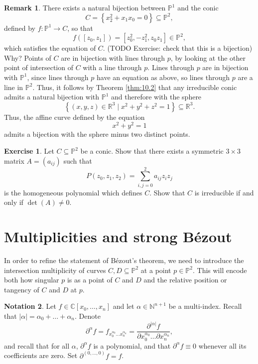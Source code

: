 \documentclass{article}
\newcommand{\N}{\mathbb{N}}
\newcommand{\R}{\mathbb{R}}
\newcommand{\C}{\mathbb{C}}
\renewcommand{\P}{\mathbb{P}}
\newcommand{\rb}[1]{\left( #1 \right)}
\renewcommand{\sb}[1]{\left[ #1 \right]}
\newcommand{\cb}[1]{\left\{ #1 \right\}}
\newcommand{\abs}[1]{\left\lvert #1 \right\rvert}
\theoremstyle{definition}\newtheorem{definition}{Definition}[section]
\theoremstyle{definition}\newtheorem{notation}[definition]{Notation}
\theoremstyle{definition}\newtheorem{remark}[definition]{Remark}
\theoremstyle{definition}\newtheorem{example}[definition]{Example}
\theoremstyle{definition}\newtheorem{fact}{Fact}
\theoremstyle{definition}\newtheorem{exercise}{Exercise}
\begin{document}
\begin{remark}
There exists a natural bijection between $ \P^1 $ and the conic
$$ C = \cb{x_2^2 + x_1x_0 = 0} \subseteq \P^2, $$
defined by $ f : \P^1 \to C $, so that
$$ f\rb{\sb{z_0, z_1}} = \sb{z_0^2, -z_1^2, z_0z_1} \in \P^2, $$
which satisfies the equation of $ C $. (TODO Exercise: check that this is a bijection) Why? Points of $ C $ are in bijection with lines through $ p $, by looking at the other point of intersection of $ C $ with a line through $ p $. Lines through $ p $ are in bijection with $ \P^1 $, since lines through $ p $ have an equation as above, so lines through $ p $ are a line in $ \P^2 $. Thus, it follows by Theorem \ref{thm:10.2} that any irreducible conic admits a natural bijection with $ \P^1 $ and therefore with the sphere
$$ \cb{\rb{x, y, z} \in \R^3 \mid x^2 + y^2 + z^2 = 1} \subseteq \R^3. $$
Thus, the affine curve defined by the equation
$$ x^2 + y^2 = 1 $$
admits a bijection with the sphere minus two distinct points.
\end{remark}

\begin{exercise}
\label{ex:31}
Let $ C \subseteq \P^2 $ be a conic. Show that there exists a symmetric $ 3 \times 3 $ matrix $ A = \rb{a_{ij}} $ such that
$$ P\rb{z_0, z_1, z_2} = \sum_{i, j = 0}^2 a_{ij}z_iz_j $$
is the homogeneous polynomial which defines $ C $. Show that $ C $ is irreducible if and only if $ \det\rb{A} \ne 0 $.
\end{exercise}

\section{Multiplicities and strong Bézout}

In order to refine the statement of Bézout's theorem, we need to introduce the intersection multiplicity of curves $ C, D \subseteq \P^2 $ at a point $ p \in \P^2 $. This will encode both how singular $ p $ is as a point of $ C $ and $ D $ and the relative position or tangency of $ C $ and $ D $ at $ p $.

\begin{notation}
Let $ f \in \C\sb{x_0, \dots, x_n} $ and let $ \alpha \in \N^{n + 1} $ be a multi-index. Recall that $ \abs{\alpha} = \alpha_0 + \dots + \alpha_n $. Denote
$$ \partial^\alpha f = f_{x_0^{\alpha_0} \dots x_n^{\alpha_n}} = \dfrac{\partial^{\abs{\alpha}} f}{\partial x_0^{\alpha_0} \dots \partial x_n^{\alpha_n}}, $$
and recall that for all $ \alpha $, $ \partial^\alpha f $ is a polynomial, and that $ \partial^\alpha f \equiv 0 $ whenever all its coefficients are zero. Set $ \partial^{\rb{0, \dots, 0}} f = f $.
\end{notation}
\end{document}
